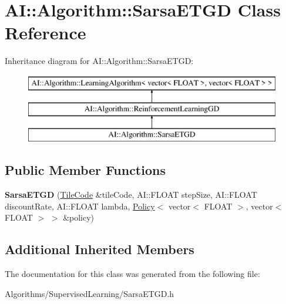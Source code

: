 \hypertarget{classAI_1_1Algorithm_1_1SarsaETGD}{\section{A\-I\-:\-:Algorithm\-:\-:Sarsa\-E\-T\-G\-D Class Reference}
\label{classAI_1_1Algorithm_1_1SarsaETGD}
}
Inheritance diagram for A\-I\-:\-:Algorithm\-:\-:Sarsa\-E\-T\-G\-D\-:\begin{figure}[H]
\begin{center}
\leavevmode
\includegraphics[height=3.000000cm]{classAI_1_1Algorithm_1_1SarsaETGD}
\end{center}
\end{figure}
\subsection*{Public Member Functions}
\begin{DoxyCompactItemize}
\item 
\hypertarget{classAI_1_1Algorithm_1_1SarsaETGD_a8c218015be9c7f62da53131d0af64d4a}{{\bfseries Sarsa\-E\-T\-G\-D} (\hyperlink{classAI_1_1Algorithm_1_1TileCode}{Tile\-Code} \&tile\-Code, A\-I\-::\-F\-L\-O\-A\-T step\-Size, A\-I\-::\-F\-L\-O\-A\-T discount\-Rate, A\-I\-::\-F\-L\-O\-A\-T lambda, \hyperlink{classAI_1_1Algorithm_1_1Policy}{Policy}$<$ vector$<$ F\-L\-O\-A\-T $>$, vector$<$ F\-L\-O\-A\-T $>$ $>$ \&policy)}\label{classAI_1_1Algorithm_1_1SarsaETGD_a8c218015be9c7f62da53131d0af64d4a}

\end{DoxyCompactItemize}
\subsection*{Additional Inherited Members}


The documentation for this class was generated from the following file\-:\begin{DoxyCompactItemize}
\item 
Algorithms/\-Supervised\-Learning/Sarsa\-E\-T\-G\-D.\-h\end{DoxyCompactItemize}
